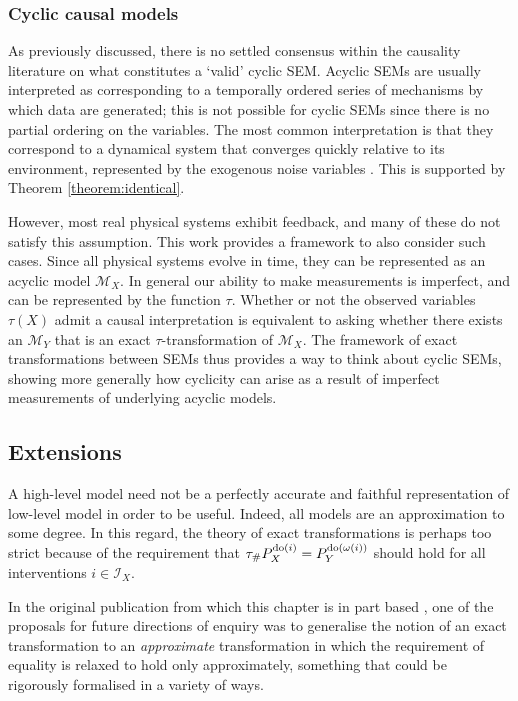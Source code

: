 \subsubsection{Cyclic causal models}

As previously discussed, there is no settled consensus within the causality literature on what constitutes a `valid' cyclic SEM.
Acyclic SEMs are usually interpreted as corresponding to a temporally ordered series of mechanisms by which data are generated; this is not possible for cyclic SEMs since there is no partial ordering on the variables.
The most common interpretation is that they correspond to a dynamical system that converges quickly relative to its environment, represented by the exogenous noise variables \citep{mooij2013ode}.
This is supported by Theorem \ref{theorem:identical}.

However, most real physical systems exhibit feedback, and many of these do not satisfy this assumption. This work provides a framework to also consider such cases.
Since all physical systems evolve in time, they can be represented as an acyclic model $\mathcal{M}_X$.
In general our ability to make measurements is imperfect, and can be represented by the function $\tau$. 
Whether or not the observed variables $\tau(X)$ admit a causal interpretation is equivalent to asking whether there exists an $\mathcal{M}_Y$ that is an exact $\tau$-transformation of $\mathcal{M}_X$.
The framework of exact transformations between SEMs thus provides a way to think about cyclic SEMs, showing more generally how cyclicity can arise as a result of imperfect measurements of underlying acyclic models.

\subsection{Extensions}

A high-level model need not be a perfectly accurate and faithful representation of low-level model in order to be useful. 
Indeed, all models are an approximation to some degree.
In this regard, the theory of exact transformations is perhaps too strict because of the requirement that $\tau_{\#}P_X^{\operatorname{do}(i)} = P_Y^{\operatorname{do}(\omega(i))}$ should hold for all interventions $i\in \mathcal{I}_X$.

In the original publication from which this chapter is in part based \citep{rubenstein2017causal}, one of the proposals for future directions of enquiry was to generalise the notion of an exact transformation to an \emph{approximate} transformation in which the requirement of equality is relaxed to hold only approximately, something that could be rigorously formalised in a variety of ways.


